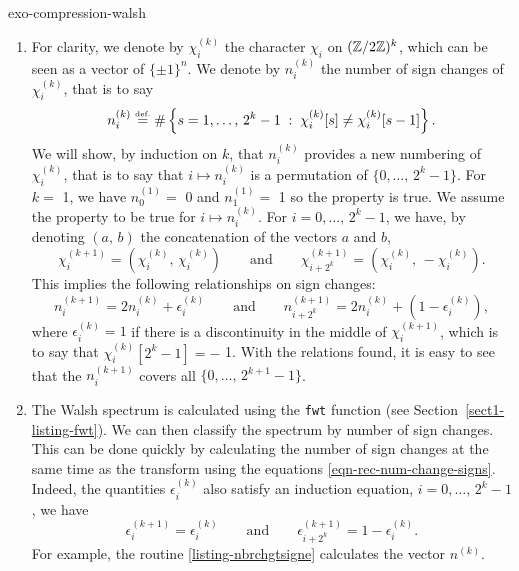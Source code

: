 \begin{correction}{exo-compression-walsh}
\begin{enumerate}
\item For clarity, we denote by $ \chi_i^{(k)} $ the character $ \chi_i $ on $ (\mathbb{Z}/2 \mathbb{Z})^k $, which can be seen as a vector of $ \{\pm 1\}^n $. We denote by $ n_i^{(k)} $ the number of sign changes of $ \chi_i^{(k)} $, that is to say
\begin{equation*}
n_i^{(k)} \stackrel{\mbox{\upshape\tiny def.}}{=} \# \left\{ s = 1, \ldots, \, 2^k-1 \;:\; \chi_i^{(k)}[s] \neq \chi_i^{(k)}[s-1] \right\}.
\end{equation*}
We will show, by induction on $ k $, that $ n_i^{(k)} $ provides a new numbering of $ \chi_i^{(k)} $, that is to say that $ i \mapsto n_i^{(k)} $ is a permutation of $ \{0, \ldots, \, 2^k-1\} $. For $ k = $ 1, we have $ n_0^{(1)} = $ 0 and $ n_1^{(1)} = $ 1 so the property is true. We assume the property to be true for $ i \mapsto n_i^{(k)} $. For $ i = 0, \ldots, \, 2^k-1 $, we have, by denoting $ (a, \, b) $ the concatenation of the vectors $ a $ and $ b $,
\begin{equation*}
\chi_i^{(k+1)} = \left(\chi_i^{(k)}, \, \chi_i^{(k)} \right) \quad \quad \text{and} \quad \quad \chi_{i + 2^k}^{(k+1)} = \left(\chi_i^{(k)}, \, - \chi_i^{(k)} \right).
\end{equation*}
This implies the following relationships on sign changes:
\begin{equation}
\label{eqn-rec-num-change-signs}
n_i^{(k+1)} = 2 n_i^{(k)} + \epsilon_i^{(k)} \quad \quad \text{and} \quad \quad n_{i + 2^k}^{(k+1)} = 2 n_i^{(k)} + (1- \epsilon_i^{(k)}),
\end{equation}
where $ \epsilon_i^{(k)} = 1 $ if there is a discontinuity in the middle of $ \chi_i^{(k+1)} $, which is to say that $ \chi_i^{(k)}[2^k-1] = - $ 1. With the relations found, it is easy to see that the $ n_i^{(k+1)} $ covers all $ \{0, \ldots, \, 2^{k+1} -1\} $.
\item The Walsh spectrum is calculated using the \texttt{\upshape fwt} function (see Section~\ref{sect1-listing-fwt}). We can then classify the spectrum by number of sign changes. This can be done quickly by calculating the number of sign changes at the same time as the transform using the equations \eqref{eqn-rec-num-change-signs}. Indeed, the quantities $ \epsilon_i^{(k)} $ also satisfy an induction equation, $ i = 0, \ldots, \, 2^k-1 $, we have
\begin{equation*}
\epsilon_i^{(k+1)} = \epsilon_i^{(k)} \quad \quad \text{and} \quad \quad \epsilon_{i + 2^k}^{(k+1)} = 1- \epsilon_i^{(k)}.
\end{equation*}
For example, the routine \Matlab{} \ref{listing-nbrchgtsigne} calculates the vector $ n^{(k)} $.


\end{enumerate}
\end{correction}
